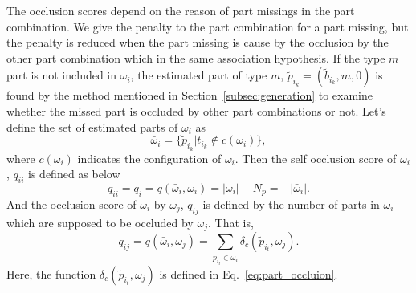 \documentclass[runningheads]{llncs}
\begin{document}
The occlusion scores depend on the reason of part missings in the part combination.
We give the penalty to the part combination for a part missing, but the penalty is reduced when the part missing is cause by the occlusion by the other part combination which in the same association hypothesis.
If the type $m$ part is not included in $\omega_i$, the estimated part of type $m$, $\tilde{p}_{i_k} = (\tilde{b}_{i_k},m,0)$ is found by the method mentioned in Section~\ref{subsec:generation} to examine whether the missed part is occluded by other part combinations or not.
Let's define the set of estimated parts of $\omega_i$ as 
\begin{equation}
   \label{eq:estimated_part_set}
   \bar{\omega}_i = \{ \tilde{p}_{i_k} | t_{i_k} \notin c(\omega_i) \},
\end{equation}
where $c(\omega_i)$ indicates the configuration of $\omega_i$.
Then the self occlusion score of $\omega_i$, $q_{ii}$ is defined as below
\begin{equation}
   \label{eq:missing_score}
   q_{ii} = q_i = q(\bar{\omega}_i, \omega_i) = |\omega_i| - N_p = - |\bar{\omega}_i|.
\end{equation}
And the occlusion score of $\omega_i$ by $\omega_j$, $q_{ij}$ is defined by the number of parts in $\bar{\omega}_i$ which are supposed to be occluded by $\omega_j$. 
That is,
\begin{equation}
   \label{eq:covering_score}
   q_{ij} = q(\bar{\omega}_i, \omega_j) = \sum_{\tilde{p}_{i_t} \in \bar{\omega}_i} \delta_c(\tilde{p}_{i_t}, \omega_j).
\end{equation}
Here, the function $\delta_c(\tilde{p}_{i_t}, \omega_j)$ is defined in Eq.~\ref{eq:part_occluion}.
\end{document}

